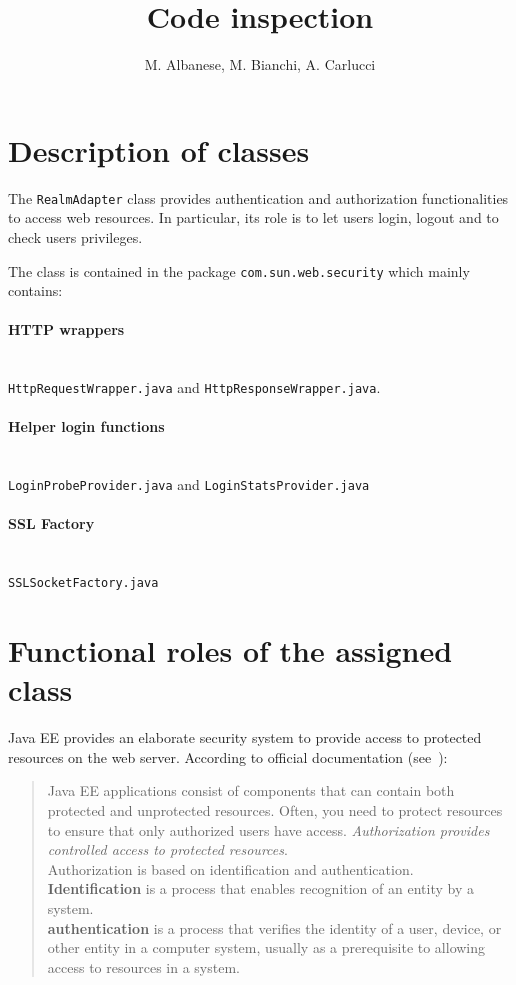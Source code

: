 \documentclass[a4paper, 11pt]{article}
\newcommand{\code}[1]{\texttt{#1}}
\begin{document}
\title{Code inspection}


\author{M. Albanese, M. Bianchi, A. Carlucci}

\maketitle
\newpage{}
\tableofcontents{}

\newpage{}


\section{Description of classes}

The \code{RealmAdapter} class provides authentication and authorization functionalities
to access web resources. In particular, its role is to let users login,
logout and to check users privileges.

The class is contained in the package \code{com.sun.web.security} which mainly
contains:
\paragraph{HTTP wrappers} \mbox{} \\  
\code{HttpRequestWrapper.java} and \code{HttpResponseWrapper.java}.


\paragraph{Helper login functions} \mbox{} \\ 
\code{LoginProbeProvider.java} and \code{LoginStatsProvider.java}

\paragraph{SSL Factory} \mbox{} \\ 
\code{SSLSocketFactory.java} 

\section{Functional roles of the assigned class}
Java EE provides an elaborate security system to provide access to protected resources on the web server. According to official documentation (see~\cite{bib:docurl}):

\begin{quotation}
    Java EE applications consist of components that can contain both protected and unprotected resources. Often, you need to protect resources to ensure that only authorized users have access. \emph{Authorization provides controlled access to protected resources}. \\
    Authorization is based on identification and authentication. \\
    \textbf{Identification} is a process that enables recognition of an entity by a system. \\
    \textbf{authentication} is a process that verifies the identity of a user, device, or other entity in a computer system, usually as a prerequisite to allowing access to resources in a system.
\end{quotation}
\end{document}
